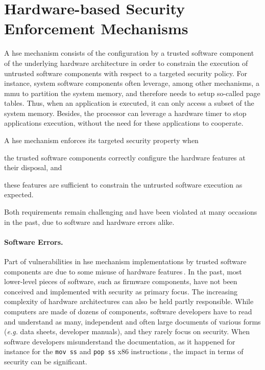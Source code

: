 \section{Hardware-based Security Enforcement Mechanisms}

A \ac{hse} mechanism consists of the configuration by a trusted software
component of the underlying hardware architecture in order to constrain the
execution of untrusted software components with respect to a targeted security
policy.
%
For instance, system software components often leverage, among other mechanisms,
a \ac{mmu} to partition the system memory, and therefore needs to setup
so-called page tables.
%
Thus, when an application is executed, it can only access a subset of the system
memory.
%
Besides, the processor can leverage a hardware timer to stop applications
execution, without the need for these applications to cooperate.

A \ac{hse} mechanism enforces its targeted security property when
%
\begin{inparaenum}[(1)]
\item the trusted software components correctly configure the hardware features
  at their disposal, and
%
\item these features are sufficient to constrain the untrusted software
  execution as expected.
\end{inparaenum}
%
Both requirements remain challenging and have been violated at many occasions in
the past, due to software and hardware errors alike.

\paragraph{Software Errors.}
%
Part of vulnerabilities in \ac{hse} mechanism implementations by trusted
software components are due to some misuse of hardware
features\,\cite{bulygin2014summary}.
%
In the past, most lower-level pieces of software, such as firmware components,
have not been conceived and implemented with security as primary focus.
%
The increasing complexity of hardware architectures can also be held partly
responsible.
%
While computers are made of dozens of components, software developers have to
read and understand as many, independent and often large documents of various
forms (\emph{e.g.} data sheets, developer manuals), and they rarely focus on
security.
%
When software developers misunderstand the documentation, as it happened for
instance for the \texttt{mov ss} and \texttt{pop ss} x86
instructions\,\cite{movsspopss}, the impact in terms of security can be
significant.


